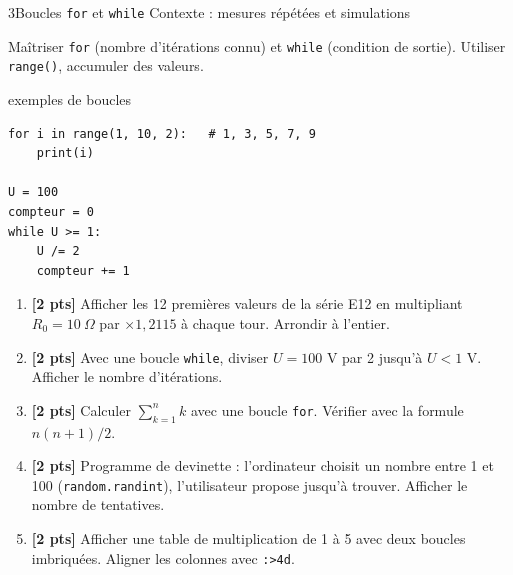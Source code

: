 \documentclass[10pt,a4paper]{article}
\begin{document}
\clearpage
\begin{tptitre}{3}{Boucles \texttt{for} et \texttt{while}}
  Contexte : mesures répétées et simulations
\end{tptitre}

\begin{objectifbox}
  Maîtriser \texttt{for} (nombre d'itérations connu) et \texttt{while} (condition de sortie). Utiliser \texttt{range()}, accumuler des valeurs.
\end{objectifbox}

\begin{codebox}{exemples de boucles}
\begin{lstlisting}
for i in range(1, 10, 2):   # 1, 3, 5, 7, 9
    print(i)

U = 100
compteur = 0
while U >= 1:
    U /= 2
    compteur += 1
\end{lstlisting}
\end{codebox}

\begin{enumerate}[leftmargin=*, label=\textbf{Q\arabic*.}]
  \item \textbf{[2 pts]} Afficher les 12 premières valeurs de la série E12 en multipliant $R_0 = 10\ \Omega$ par $\times 1{,}2115$ à chaque tour. Arrondir à l'entier.
  \item \textbf{[2 pts]} Avec une boucle \texttt{while}, diviser $U = 100$ V par 2 jusqu'à $U < 1$ V. Afficher le nombre d'itérations.
  \item \textbf{[2 pts]} Calculer $\sum_{k=1}^{n} k$ avec une boucle \texttt{for}. Vérifier avec la formule $n(n+1)/2$.
  \item \textbf{[2 pts]} Programme de devinette : l'ordinateur choisit un nombre entre 1 et 100 (\texttt{random.randint}), l'utilisateur propose jusqu'à trouver. Afficher le nombre de tentatives.
  \item \textbf{[2 pts]} Afficher une table de multiplication de 1 à 5 avec deux boucles imbriquées. Aligner les colonnes avec \texttt{:>4d}.
\end{enumerate}
\end{document}
